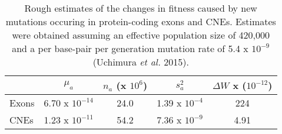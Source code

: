 


\begin{table}
\centering

\caption{Rough estimates of the changes in fitness caused by new mutations occuring in protein-coding exons and CNEs. Estimates were obtained assuming an effective population size of 420,000 and a per base-pair per generation mutation rate of 5.4 x $10^{-9}$ (Uchimura \textit{et al.} 2015).}
 \begin{tabular}{l c c c c} 

  \hline
		& $\mu_a$  & $n_a$ (x $10^6$)& $s_a^2$ & $\Delta W$ x ($10^{-12}$) \\ [0.5ex] \hline
	Exons & 6.70 x $10^{-14}$ & 24.0 & 1.39 x $10^{-4}$ & 224 \\
	CNEs  & 1.23 x $10^{-11}$ & 54.2 & 7.36 x $10^{-9}$ & 4.91 \\ \hline
\end{tabular}    
    \label{tab:Fitness}

\end{table}
